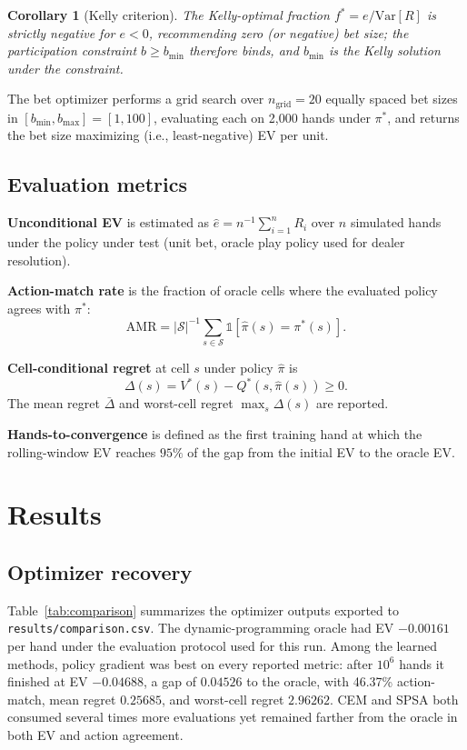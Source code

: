\documentclass[12pt]{article}
\newtheorem{corollary}{Corollary}
\begin{document}
\begin{corollary}[Kelly criterion]
The Kelly-optimal fraction\cite{Kelly1956} $f^* = e/\mathrm{Var}[R]$ is strictly
negative for $e < 0$, recommending zero (or negative) bet size; the participation
constraint $b \geq b_\mathrm{min}$ therefore binds, and $b_\mathrm{min}$ is the Kelly
solution under the constraint.
\end{corollary}

The bet optimizer performs a grid search over $n_\mathrm{grid} = 20$ equally spaced bet
sizes in $[b_\mathrm{min}, b_\mathrm{max}] = [1, 100]$, evaluating each on 2,000 hands
under $\pi^*$, and returns the bet size maximizing (i.e., least-negative) EV per unit.

\subsection{Evaluation metrics}

\textbf{Unconditional EV} is estimated as $\hat{e} = n^{-1}\sum_{i=1}^n R_i$ over $n$
simulated hands under the policy under test (unit bet, oracle play policy used for
dealer resolution).

\textbf{Action-match rate} is the fraction of oracle cells where the evaluated policy
agrees with $\pi^*$:
\[
  \mathrm{AMR} = |\mathcal{S}|^{-1} \sum_{s \in \mathcal{S}} \mathbb{1}[\hat\pi(s) = \pi^*(s)].
\]

\textbf{Cell-conditional regret} at cell $s$ under policy $\hat\pi$ is
\[
  \Delta(s) = V^*(s) - Q^*(s, \hat\pi(s)) \geq 0.
\]
The mean regret $\bar\Delta$ and worst-cell regret $\max_s \Delta(s)$ are reported.

\textbf{Hands-to-convergence} is defined as the first training hand at which the
rolling-window EV reaches $95\%$ of the gap from the initial EV to the oracle EV.

\section{Results}

\subsection{Optimizer recovery}

Table~\ref{tab:comparison} summarizes the optimizer outputs exported to
\texttt{results/comparison.csv}.  The dynamic-programming oracle had EV
$-0.00161$ per hand under the evaluation protocol used for this run.  Among the
learned methods, policy gradient was best on every reported metric: after
$10^6$ hands it finished at EV $-0.04688$, a gap of $0.04526$ to the oracle, with
46.37\% action-match, mean regret $0.25685$, and worst-cell regret $2.96262$.
CEM and SPSA both consumed several times more evaluations yet remained farther from the
oracle in both EV and action agreement.
\end{document}
